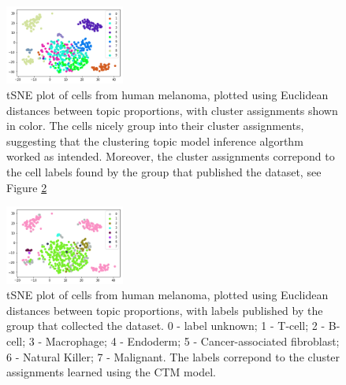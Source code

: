 \documentclass{article}
\begin{document}
\begin{figure}
    \centering
    \includegraphics[width=0.35\textwidth]{figs/clusters_CTM}
    \caption{tSNE plot of cells from human melanoma, plotted using Euclidean distances between topic proportions, with cluster assignments shown in color. The cells nicely group into their cluster assignments, suggesting that the clustering topic model inference algorthm worked as intended. Moreover, the cluster assignments correpond to the cell labels found by the group that published the dataset, see Figure \ref{fig:clusters_true} }
    \label{fig:clusters_CTM}
\end{figure}
\begin{figure}
    \centering
    \includegraphics[width=0.35\textwidth]{figs/clusters_true}
    \caption{tSNE plot of cells from human melanoma, plotted using Euclidean distances between topic proportions, with labels published by the group that collected the dataset. 0 - label unknown; 1 - T-cell; 2 - B-cell; 3 - Macrophage; 4 - Endoderm; 5 - Cancer-associated fibroblast; 6 - Natural Killer; 7 - Malignant. The labels correpond to the cluster assignments learned using the CTM model.}
    \label{fig:clusters_true}
\end{figure}
\end{document}
